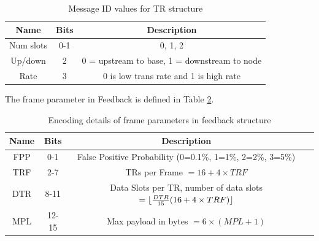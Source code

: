\documentclass{article}
\DeclarePairedDelimiter{\floor}{\lfloor}{\rfloor}
\begin{document}
\begin{table}[H]
\centering
\caption{Message ID values for TR structure}
\label{app:table:low-bits}
\begin{tabular}{|c|c|c|}
\hline
Name      & Bits & Description \\ \hline \hline
Num slots & 0-1  & 0, 1, 2                                                          \\ \hline
Up/down   & 2    & 0 = upstream to base, 1 = downstream to node                     \\ \hline
Rate      & 3    & 0 is low trans rate and 1 is high rate \\ \hline
\end{tabular}
\end{table}

The frame parameter in Feedback is defined in Table \ref{app:table:frame-parameter}.

\begin{table}[H]
\centering
\caption{Encoding details of frame parameters in feedback structure}
\label{app:table:frame-parameter}
\begin{tabular}{|c|c|c|c|}
\hline
Name & Bits  & Description  \\ \hline \hline
FPP  & 0-1   & False Positive Probability (0=0.1\%, 1=1\%, 2=2\%, 3=5\%) \\ \hline
TRF  & 2-7   & TRs per Frame $= 16+4\times TRF $                                              \\ \hline
DTR  & 8-11  & Data Slots per TR, number of data slots $= \floor{\frac{DTR}{15} (16+4\times TRF)}$                  \\ \hline
MPL  & 12-15 & Max payload in bytes $=6 \times(MPL+1)$                     \\         \hline     
\end{tabular}
\end{table}
\end{document}
